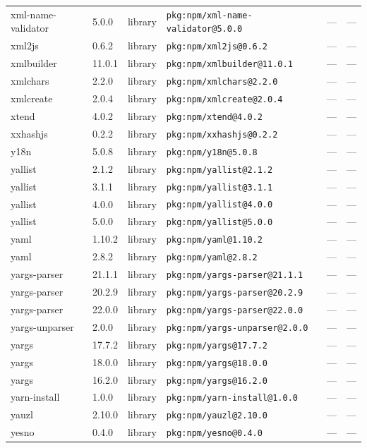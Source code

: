 \documentclass[11pt]{article}
\begin{document}
\begin{longtable}{|l|l|l|p{2.2cm}|l|p{4cm}|}
xml-name-validator & 5.0.0 & library & \texttt{pkg:npm/xml-name-validator@5.0.0} & — & — \\
xml2js & 0.6.2 & library & \texttt{pkg:npm/xml2js@0.6.2} & — & — \\
xmlbuilder & 11.0.1 & library & \texttt{pkg:npm/xmlbuilder@11.0.1} & — & — \\
xmlchars & 2.2.0 & library & \texttt{pkg:npm/xmlchars@2.2.0} & — & — \\
xmlcreate & 2.0.4 & library & \texttt{pkg:npm/xmlcreate@2.0.4} & — & — \\
xtend & 4.0.2 & library & \texttt{pkg:npm/xtend@4.0.2} & — & — \\
xxhashjs & 0.2.2 & library & \texttt{pkg:npm/xxhashjs@0.2.2} & — & — \\
y18n & 5.0.8 & library & \texttt{pkg:npm/y18n@5.0.8} & — & — \\
yallist & 2.1.2 & library & \texttt{pkg:npm/yallist@2.1.2} & — & — \\
yallist & 3.1.1 & library & \texttt{pkg:npm/yallist@3.1.1} & — & — \\
yallist & 4.0.0 & library & \texttt{pkg:npm/yallist@4.0.0} & — & — \\
yallist & 5.0.0 & library & \texttt{pkg:npm/yallist@5.0.0} & — & — \\
yaml & 1.10.2 & library & \texttt{pkg:npm/yaml@1.10.2} & — & — \\
yaml & 2.8.2 & library & \texttt{pkg:npm/yaml@2.8.2} & — & — \\
yargs-parser & 21.1.1 & library & \texttt{pkg:npm/yargs-parser@21.1.1} & — & — \\
yargs-parser & 20.2.9 & library & \texttt{pkg:npm/yargs-parser@20.2.9} & — & — \\
yargs-parser & 22.0.0 & library & \texttt{pkg:npm/yargs-parser@22.0.0} & — & — \\
yargs-unparser & 2.0.0 & library & \texttt{pkg:npm/yargs-unparser@2.0.0} & — & — \\
yargs & 17.7.2 & library & \texttt{pkg:npm/yargs@17.7.2} & — & — \\
yargs & 18.0.0 & library & \texttt{pkg:npm/yargs@18.0.0} & — & — \\
yargs & 16.2.0 & library & \texttt{pkg:npm/yargs@16.2.0} & — & — \\
yarn-install & 1.0.0 & library & \texttt{pkg:npm/yarn-install@1.0.0} & — & — \\
yauzl & 2.10.0 & library & \texttt{pkg:npm/yauzl@2.10.0} & — & — \\
yesno & 0.4.0 & library & \texttt{pkg:npm/yesno@0.4.0} & — & — \\

\end{longtable}
\end{document}
